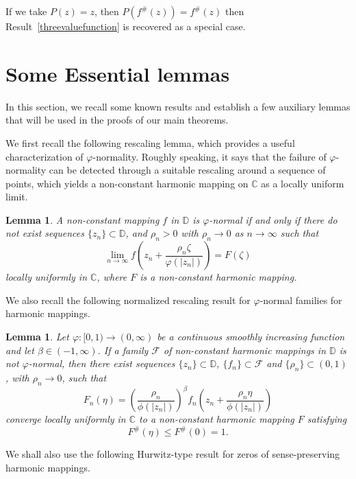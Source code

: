 \documentclass[11pt, reqno]{amsart}
\numberwithin{equation}{section}
\theoremstyle{definition}
\theoremstyle{remark}
\theoremstyle{plain}
\newtheorem{lemma}[definition]{Lemma}
\begin{document}
If we take $P(z)=z$, then $P(f^\#(z))=f^\#(z)$ then
 Result~\ref{threevaluefunction} is recovered as a special case.

\section{Some Essential lemmas}

In this section, we recall some known results and establish a
few auxiliary lemmas that will be used in the proofs of our
main theorems.
\smallskip

We first recall the following rescaling lemma, which provides a useful characterization of
$\varphi$-normality. Roughly speaking, it says that the failure of
$\varphi$-normality can be detected through a suitable rescaling around a
sequence of points, which yields a non-constant harmonic mapping on
$\mathbb{C}$ as a locally uniform limit.

\begin{lemma}\label{zalharfun}\cite[Theorem 1.3]{Bohra}
  A non-constant mapping $f$ in $\mathbb{D}$ is
   $\varphi$-normal if and only if there do not exist sequences
   $\{z_n\}\subset\mathbb{D}$, and $\rho_n >0$ with $\rho_n \to 0$ 
   as $n\to \infty$ such that
   \[
   \lim_{n\to\infty}f\left(z_n+\frac{\rho_n\zeta}{\varphi(|z_n|)}\right)=F(\zeta)
   \]
   locally uniformly in $\mathbb{C}$, where $F$ is a non-constant harmonic mapping.
  
  \end{lemma}
  
  We also recall the following normalized rescaling result for 
  $\varphi$-normal families for harmonic mappings.
\begin{lemma}\label{zalcmann}\cite[Theorem 1.11]{charakbharti}
Let $\varphi:[0,1)\to(0,\infty)$ be a continuous smoothly increasing
function and let $\beta\in(-1,\infty)$. If a family
$\mathcal{F}$ of non-constant harmonic mappings in $\mathbb{D}$ is
not $\varphi$-normal, then there exist sequences
$\{z_n\}\subset\mathbb{D}$,
$\{f_n\}\subset\mathcal{F}$ and
$\{\rho_n\}\subset(0,1)$, with
$\rho_n\to0$, such that
\[
F_n(\eta)
=
\left(
\frac{\rho_n}{\phi(|z_n|)}
\right)^{\beta}
f_n\!\left(
z_n+
\frac{\rho_n\eta}{\phi(|z_n|)}
\right)
\]
converge locally uniformly in $\mathbb{C}$ to a non-constant harmonic
mapping $F$ satisfying
\[
F^{\#}(\eta)\leq F^{\#}(0)=1.
\]
\end{lemma}

We shall also use the following Hurwitz-type result for
zeros of sense-preserving harmonic mappings.
\end{document}

